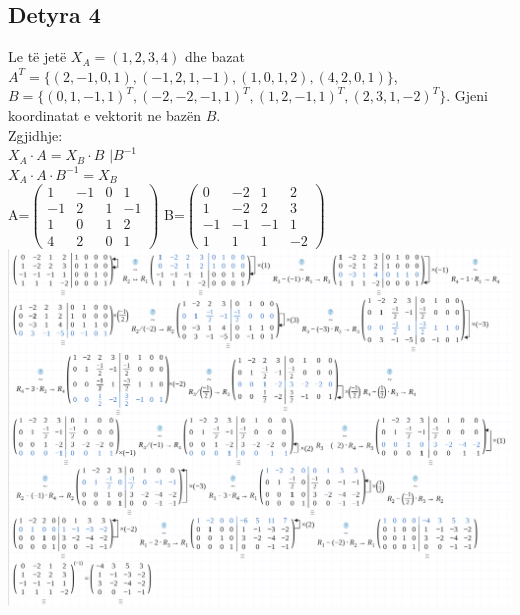 \documentclass[12pt]{article}
\begin{document}
\subsection*{Detyra 4}
Le të jetë $X_A=(1,2,3,4)$ dhe bazat $ A^T=\{(2,-1,0,1),(-1,2,1,-1),(1,0,1,2),(4,2,0,1)\}$,\\ $B=\{(0,1,-1,1)^T,(-2,-2,-1,1)^T,(1,2,-1,1)^T,(2,3,1,-2)^T\}$. Gjeni koordinatat e vektorit ne bazën $B$.\\
Zgjidhje:\\
$X_A \cdot A = X_B \cdot B$  $| B^{-1}$\\
$X_A\cdot A \cdot B^{-1}=X_B$\\
A=$\left(\begin{matrix}
            1  & -1 & 0 & 1  \\
            -1 & 2  & 1 & -1 \\
            1  & 0  & 1 & 2  \\
            4  & 2  & 0 & 1
        \end{matrix}\right)$
B=$\left(\begin{matrix}
            0  & -2 & 1  & 2  \\
            1  & -2 & 2  & 3  \\
            -1 & -1 & -1 & 1  \\
            1  & 1  & 1  & -2
        \end{matrix}\right)$\\
\includegraphics[scale=.5]{inverse2.png}\\
\end{document}
